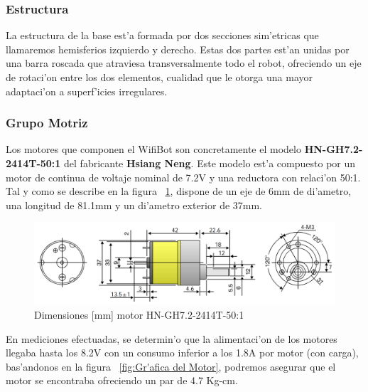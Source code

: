 \documentclass[twoside,12pt]{article}
\begin{document}
\subsubsection{Estructura}

La estructura de la base est'a formada por dos secciones sim'etricas que llamaremos hemisferios izquierdo y derecho. Estas dos partes est'an unidas por una barra roscada que atraviesa transversalmente todo el robot, ofreciendo un eje de rotaci'on entre los dos elementos, cualidad que le otorga una mayor adaptaci'on a superf'icies irregulares.

\subsubsection{Grupo Motriz}
Los motores que componen el WifiBot son concretamente el modelo \textbf{HN-GH7.2-2414T-50:1} del fabricante \textbf{Hsiang Neng}. Este modelo est'a compuesto por un motor de continua de voltaje nominal de 7.2V y una reductora con relaci'on 50:1. Tal y como se describe en la figura ~\ref{fig:Dimensiones del Motor}, dispone de un eje de 6mm de di'ametro, una longitud de 81.1mm y un di'ametro exterior de 37mm. 

\begin{figure}[ht]
\centering
\includegraphics[scale=0.35]{images/motor_dimensions.png} 
\caption{Dimensiones [mm] motor HN-GH7.2-2414T-50:1}
\label{fig:Dimensiones del Motor}
\end{figure}

En mediciones efectuadas, se determin'o que la alimentaci'on de los motores llegaba hasta los 8.2V con un consumo inferior a los 1.8A por motor (con carga), bas'andonos en la figura ~\ref{fig:Gr'afica del Motor}, podremos asegurar que el motor se encontraba ofreciendo un par de 4.7 Kg-cm. 
\end{document}
